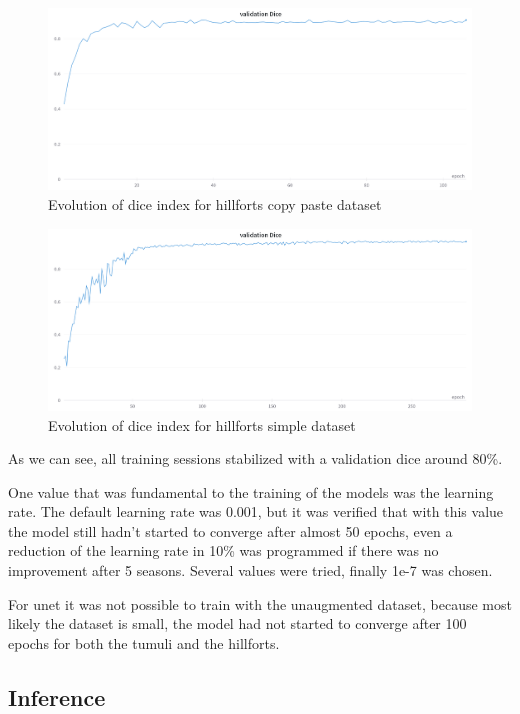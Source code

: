 \begin{figure}[H]
\centering
\includegraphics[width=12cm]{images/unet/castros_copy.png}
\caption{Evolution of dice index for hillforts copy paste dataset}
\label{dice3}
\end{figure}

\begin{figure}[H]
\centering
\includegraphics[width=12cm]{images/unet/castros_simple.png}
\caption{Evolution of dice index for hillforts simple dataset}
\label{dice4}
\end{figure}

As we can see, all training sessions stabilized with a validation dice around 80\%.

One value that was fundamental to the training of the models was the learning rate. The default learning rate was 0.001, but it was verified that with this value the model still hadn't started to converge after almost 50 epochs, even a reduction of the learning rate in 10\% was programmed if there was no improvement after 5 seasons. Several values were tried, finally 1e-7 was chosen.

For unet it was not possible to train with the unaugmented dataset, because most likely the dataset is small, the model had not started to converge after 100 epochs for both the tumuli and the hillforts.


\subsection{Inference}

